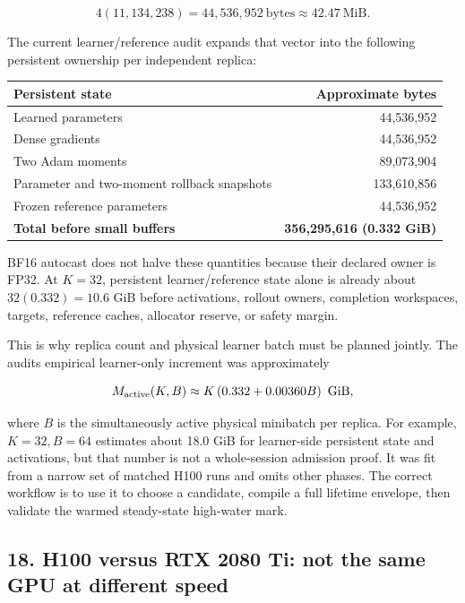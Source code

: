 \documentclass[
  10pt,
  letterpaper,
]{article}
\newcounter{none} %
\begin{document}
\[
4(11,134,238)=44,536,952\ \text{bytes}\approx42.47\ \text{MiB}.
\]

The current learner/reference audit expands that vector into the
following persistent ownership per independent replica:

{\def\LTcaptype{none} %
\begin{longtable}[]{@{}lr@{}}
\toprule\noalign{}
Persistent state & Approximate bytes \\
\midrule\noalign{}
\endhead
\bottomrule\noalign{}
\endlastfoot
Learned parameters & 44,536,952 \\
Dense gradients & 44,536,952 \\
Two Adam moments & 89,073,904 \\
Parameter and two-moment rollback snapshots & 133,610,856 \\
Frozen reference parameters & 44,536,952 \\
\textbf{Total before small buffers} & \textbf{356,295,616 (0.332
GiB)} \\
\end{longtable}
}

BF16 autocast does not halve these quantities because their declared
owner is FP32. At \(K=32\), persistent learner/reference state alone is
already about \(32(0.332)=10.6\) GiB before activations, rollout owners,
completion workspaces, targets, reference caches, allocator reserve, or
safety margin.

This is why replica count and physical learner batch must be planned
jointly. The audit\textquotesingle s empirical learner-only increment
was approximately

\[
M_{\rm active}(K,B)\approx
K\left(0.332+0.00360B\right)\ \text{GiB},
\]

where \(B\) is the simultaneously active physical minibatch per replica.
For example, \(K=32,B=64\) estimates about 18.0 GiB for learner-side
persistent state and activations, but that number is not a whole-session
admission proof. It was fit from a narrow set of matched H100 runs and
omits other phases. The correct workflow is to use it to choose a
candidate, compile a full lifetime envelope, then validate the warmed
steady-state high-water mark.

\subsection{18. H100 versus RTX 2080 Ti: not the same GPU at different
speed}\label{18-h100-versus-rtx-2080-ti-not-the-same-gpu-at-different-speed}
\end{document}
